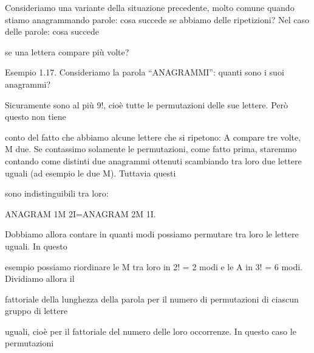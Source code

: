 \documentclass[a4paper,portrait,12pt]{article}
\begin{document}
\begin{flushleft}
Consideriamo una variante della situazione precedente, molto comune quando stiamo anagrammando parole: cosa succede se abbiamo delle ripetizioni? Nel caso delle parole: cosa succede
\end{flushleft}


\begin{flushleft}
se una lettera compare più volte?
\end{flushleft}


\begin{flushleft}
Esempio 1.17. Consideriamo la parola ``ANAGRAMMI'': quanti sono i suoi anagrammi?
\end{flushleft}


\begin{flushleft}
Sicuramente sono al più 9!, cio\`{e} tutte le permutazioni delle sue lettere. Per\`{o} questo non tiene
\end{flushleft}


\begin{flushleft}
conto del fatto che abbiamo alcune lettere che si ripetono: A compare tre volte, M due. Se contassimo solamente le permutazioni, come fatto prima, staremmo contando come distinti due anagrammi ottenuti scambiando tra loro due lettere uguali (ad esempio le due M). Tuttavia questi
\end{flushleft}


\begin{flushleft}
sono indistinguibili tra loro:
\end{flushleft}


\begin{flushleft}
ANAGRAM 1M 2I=ANAGRAM 2M 1I.
\end{flushleft}


\begin{flushleft}
Dobbiamo allora contare in quanti modi possiamo permutare tra loro le lettere uguali. In questo
\end{flushleft}


\begin{flushleft}
esempio possiamo riordinare le M tra loro in 2! = 2 modi e le A in 3! = 6 modi. Dividiamo allora il
\end{flushleft}


\begin{flushleft}
fattoriale della lunghezza della parola per il numero di permutazioni di ciascun gruppo di lettere
\end{flushleft}


\begin{flushleft}
uguali, cio\`{e} per il fattoriale del numero delle loro occorrenze. In questo caso le permutazioni
\end{flushleft}
\end{document}
